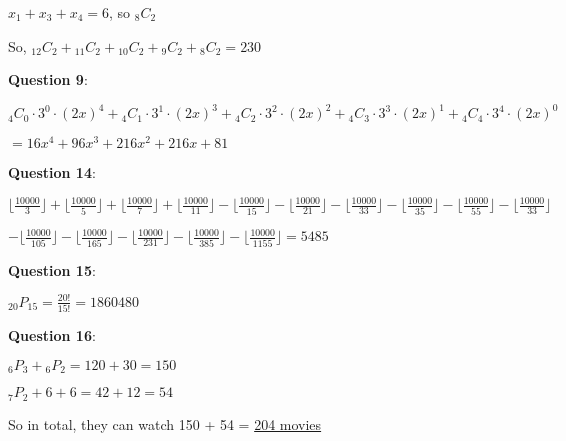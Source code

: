 \documentclass{article} %
\newcommand{\question}[2][]{\begin{flushleft}
        \textbf{Question #1}: \textit{#2}

\end{flushleft}}
\newcommand{\comb}[2][]{
    {}_{#1} C_{#2}
}
\newcommand{\perm}[2]{
    {}_{#1} P_{#2}
}
\newcommand{\fl}[1]{
    \lfloor \frac{10000}{#1} \rfloor
}
\begin{document}
    \tabto{1cm} $x_1 + x_3 + x_4 = 6$, so ${}_{8} C_2$

    So, ${}_{12} C_2 + {}_{11} C_2 + {}_{10} C_2 + {}_{9} C_2 + {}_{8} C_2 = 230$

    \question[9]{}

    $\comb[4]{0} \cdot 3^0 \cdot (2x)^4 + \comb[4]{1} \cdot 3^1 \cdot (2x)^3 + \comb[4]{2} \cdot 3^2 \cdot (2x)^2 + \comb[4]{3} \cdot 3^3 \cdot (2x)^1 + \comb[4]{4} \cdot 3^4 \cdot (2x)^0$

    $= 16x^4 + 96x^3 + 216x^2 + 216x + 81$

    \question[14]{}

    $\fl{3} + \fl{5} + \fl{7} + \fl{11} - \fl{15} - \fl{21} - \fl{33} - \fl{35} - \fl{55} - \fl{33}$

    \vspace{0.2cm}
    $- \fl{105} - \fl{165} - \fl{231} - \fl{385} - \fl{1155} = 5485$

    \question[15]{}

    $\perm{20}{15} = \frac{20!}{15!} = 1860480$

    \question[16]{}

    $\perm{6}{3} + \perm{6}{2} = 120 + 30 = 150$

    $\perm{7}{2} + 6 + 6 = 42 + 12 = 54$

    So in total, they can watch 150 + 54 = \underline{204 movies}


    
\end{document}
